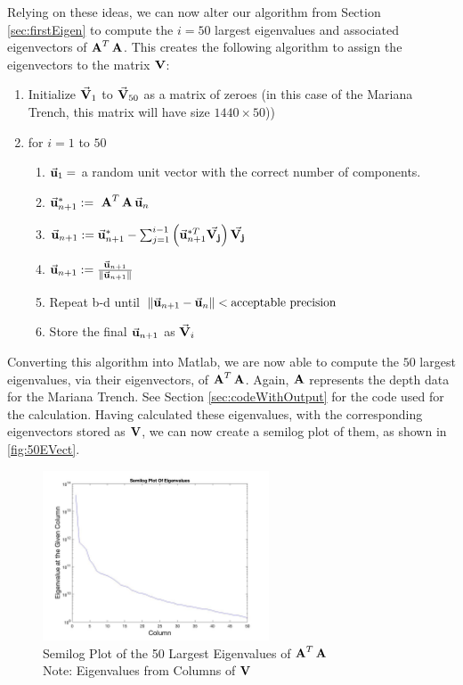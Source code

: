 Relying on these ideas, we can now alter our algorithm from Section \ref{sec:firstEigen} to compute the $i=50$ largest eigenvalues and associated eigenvectors of $\operatorname{\mathbf{A}}^T\operatorname{\mathbf{A}}$. This creates the following algorithm to assign the eigenvectors to the
matrix $\operatorname{\mathbf{V}}$:
\begin{enumerate}
    \item  Initialize $\vec{\mathbf{V}}_1$ to $\vec{\mathbf{V}}_{50}$ as a matrix of zeroes (in this case of the Mariana Trench, this matrix will have size $1440 \times 50$))
    \item for $i=1$ to $50$
    \begin{enumerate}
    \item $\vec{\mathbf{u}}_1 = $  a random unit vector with the correct number of components.
    \item $\mvec{u}_{n+1}^{*} :=\ \mtrA^T\mtrA\mvec{u}_{n} $
    \item $\vec{\mathbf{u}}_{n+1} := \vec{\mathbf{u}}_{n+1}^{*}-\sum _{j=1}^{i-1}\left(\vec{\mathbf{u}}_{n+1}^{* T\:}\vec{\mathbf{V_j}}\right)\vec{\mathbf{V_j}}$
    \item $\vec{\mathbf{u}}_{n+1} := \frac{\vec{\mathbf{u}}_{n+1}}{\lVert\vec{\mathbf{u}}_{n+1}\rVert}$
    \item Repeat b-d until $\lVert \vec{\mathbf{u}}_{n+1} -  \vec{\mathbf{u}}_{n} \rVert < \text{acceptable precision}$
    \item Store the final $\vec{\mathbf{u}}_{n+1}$ as $\vec{\mathbf{V}}_i$
    \end{enumerate}
\end{enumerate}
Converting this algorithm into Matlab, we are now able to compute the $50$ largest eigenvalues, via their eigenvectors, of $\operatorname{\mathbf{A}}^T\operatorname{\mathbf{A}}$. Again, $\operatorname{\mathbf{A}}$ represents the depth data for the Mariana Trench. See Section \ref{sec:codeWithOutput} for the code used for the calculation. Having calculated these eigenvalues, with the corresponding eigenvectors stored as $\operatorname{\mathbf{V}}$, we can now create a semilog plot of them, as shown in \autoref{fig:50EVect}.
\begin{figure}[H]
    \centering
    \includegraphics[width=0.6\textwidth]{./imgs/EigenvaluesFor50.jpg}
    \caption{Semilog Plot of the 50 Largest Eigenvalues of $\operatorname{\mathbf{A}}^T\operatorname{\mathbf{A}}$ \\ Note: Eigenvalues from Columns of $\operatorname{\mathbf{V}}$}
    \label{fig:50EVect}
\end{figure}
